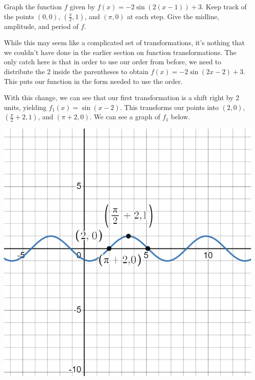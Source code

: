 \documentclass{ximera}
\begin{document}
\begin{example}
Graph the function $f$ given by $f(x) = -2\sin(2(x - 1)) + 3$. Keep track of the points $(0, 0)$, $\left(\frac{\pi}{2}, 1\right)$, and $(\pi, 0)$ at each step. Give the midline, amplitude, and period of $f$. 
\begin{explanation}
While this may seem like a complicated set of transformations, it's nothing that we couldn't have done in the earlier section on function transformations. The only catch here is that in order to use our order from before, we need to distribute the 2 inside the parentheses to obtain $f(x) = -2\sin(2x - 2) + 3$. This puts our function in the form needed to use the order. 

With this change, we can see that our first transformation is a shift right by 2 units, yielding $f_1(x) = \sin(x - 2)$. This transforms our points into $(2, 0)$, $\left(\frac{\pi}{2} + 2, 1 \right)$, and $(\pi + 2, 0)$.  We can see a graph of $f_1$ below.
\begin{image}
\includegraphics[width=0.8\linewidth]{images/graph-2-ex1.png}
\end{image}


\end{explanation}
\end{example}
\end{document}
